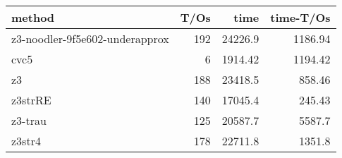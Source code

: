 \begin{tabular}{lrrr}
\hline
 method                         &   T/Os &     time &   time-T/Os \\
\hline
 z3-noodler-9f5e602-underapprox &    192 & 24226.9  &     1186.94 \\
 cvc5                           &      6 &  1914.42 &     1194.42 \\
 z3                             &    188 & 23418.5  &      858.46 \\
 z3strRE                        &    140 & 17045.4  &      245.43 \\
 z3-trau                        &    125 & 20587.7  &     5587.7  \\
 z3str4                         &    178 & 22711.8  &     1351.8  \\
\hline
\end{tabular}
